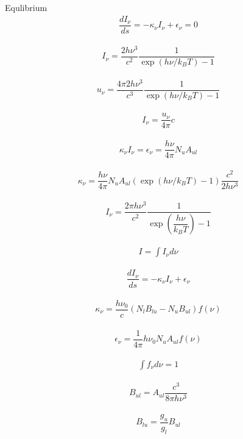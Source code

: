 Equlibrium
\begin{align}
	\dfrac{d I_{\nu}}{ds} = - \kappa_{\nu} I_{\nu} + \epsilon_{\nu} = 0
\end{align}

\begin{align}
	I_{\nu} = \dfrac{2 h \nu^3}{c^2}  \dfrac{1}{\exp(h \nu /  k_B T) - 1}
\end{align}

\begin{align}
	u_{\nu} = \dfrac{4 \pi 2 h \nu^3}{c^3}  \dfrac{1}{\exp(h \nu /  k_B T) - 1}
\end{align}

\begin{align}
	I_{\nu} = \dfrac{u_{\nu}}{4 \pi} c
\end{align}

\begin{align}
	\kappa_{\nu} I_{\nu} = \epsilon_{\nu} = \dfrac{h \nu}{4 \pi} N_u A_{ul}
\end{align}

\begin{align}
	\kappa_{\nu} = \dfrac{h \nu}{4 \pi} N_u A_{ul} (\exp(h \nu /  k_B T) - 1) \dfrac{c^2}{2 h \nu^3}
\end{align}


\begin{align}
	I_\nu = \dfrac{2 \pi h \nu^3}{c^2} \dfrac{1}{\exp\left(\dfrac{h \nu}{k_B T}\right) - 1}
\end{align}

\begin{align}
	I = \int I_{\nu} d\nu
\end{align}

\begin{align}
	\dfrac{d I_{\nu}}{ds} = - \kappa_\nu I_{\nu} + 	\epsilon_\nu
\end{align}

\begin{align}
	\kappa_\nu = \dfrac{h \nu_0}{c} \left(N_l B_{lu} - N_u B_{ul}\right) f(\nu)
\end{align}

\begin{align}
	\epsilon_\nu = \dfrac{1}{4 \pi} h \nu_0 N_u A_{ul}  f(\nu)
\end{align}

\begin{align}
	\int f_{\nu} d\nu = 1
\end{align}

\begin{align}
	B_{ul} = A_{ul} \dfrac{c^3}{8 \pi h \nu^3}
\end{align}

\begin{align}
	B_{lu} = \dfrac{g_u}{g_l} B_{ul}
\end{align}
